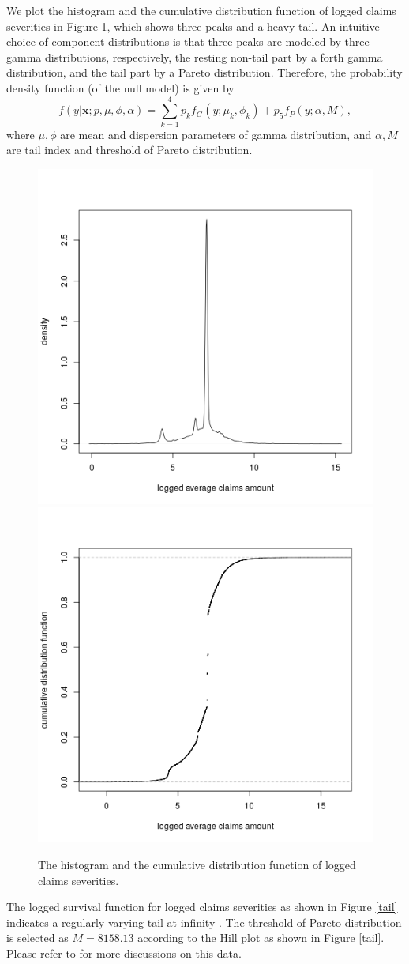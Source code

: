 \documentclass[11pt]{article}
\numberwithin{equation}{section}
\def\bx{\boldsymbol{x}}
\begin{document}
We plot the histogram and the cumulative distribution function of logged claims severities in Figure \ref{hist}, which shows three peaks and a heavy tail. 
An intuitive choice of component distributions is that 
three peaks are modeled by three gamma distributions, respectively, the resting non-tail part by a forth gamma distribution, and the tail part by a Pareto distribution.
Therefore, the probability density function (of the null model) is given by
\begin{equation}\label{sev-0}
	f(y|\bx;p,\mu,\phi,\alpha)=\sum_{k=1}^4p_kf_{G}(y;\mu_k,\phi_k)+p_5f_{P}(y;\alpha,M),
\end{equation}
	where $\mu,\phi$ are mean and dispersion parameters of gamma distribution, and $\alpha, M$ are tail index and threshold of Pareto distribution. 
\begin{figure}[h!]
	\centering
	\includegraphics[width=0.4\linewidth]{../plots/sev/hist.png}
	\includegraphics[width=0.4\linewidth]{../plots/sev/cdf.png}
	\caption{The histogram and the cumulative distribution function of logged claims severities.}\label{hist}
\end{figure}

	The logged survival function for logged claims severities as shown in Figure \ref{tail} indicates a regularly varying  tail at infinity \citep{embrechts2013modelling}.
	The threshold of Pareto distribution is selected as $M=8158.13$ according to the Hill plot \citep{resnick1997heavy} as shown in Figure \ref{tail}. Please refer to \citet{wuthrich2022statistical} for more discussions on this data.
	
\end{document}
